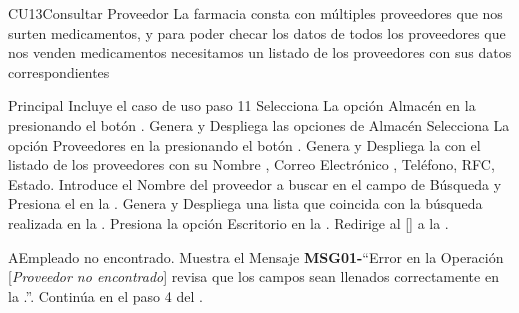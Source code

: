 \begin{UseCase}{CU13}{Consultar Proveedor}{
		La farmacia consta con múltiples proveedores que nos surten medicamentos,  y para poder checar los datos de todos los proveedores que nos venden medicamentos necesitamos un listado de los proveedores con sus datos correspondientes
	}
	\end{UseCase}
	\begin{UCtrayectoria}{Principal}
		\UCpaso Incluye el caso de uso  paso 11
		\UCpaso[\UCactor] Selecciona La opción Almacén en la  presionando el botón .
		\UCpaso Genera y Despliega las opciones de Almacén  
		\UCpaso [\UCactor] Selecciona La opción Proveedores en la  presionando el botón .
		\UCpaso Genera y Despliega la  con el listado de los proveedores con su Nombre , Correo Electrónico , Teléfono, RFC, Estado.
		\UCpaso[\UCactor] Introduce el Nombre del proveedor a buscar en el campo de Búsqueda y Presiona el  en la .
		\UCpaso Genera y Despliega una lista que coincida con la búsqueda realizada en la . 
		\UCpaso [\UCactor] Presiona la opción Escritorio en la .
		\UCpaso Redirige al [\UCactor] a la  .
	\end{UCtrayectoria}


\begin{UCtrayectoriaA}{A}{Empleado no encontrado.}
			\UCpaso Muestra el Mensaje {\bf MSG01-}``Error en la Operación [{\em Proveedor no encontrado}] revisa que los campos sean llenados correctamente en la .''.
			\UCpaso Continúa en el paso 4 del .
		\end{UCtrayectoriaA}
